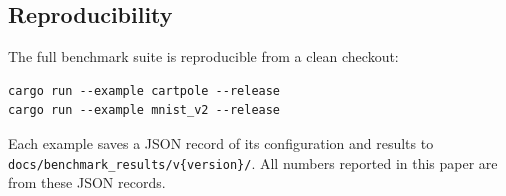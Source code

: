 \subsection{Reproducibility}

The full benchmark suite is reproducible from a clean checkout:
\begin{verbatim}
cargo run --example cartpole --release
cargo run --example mnist_v2 --release
\end{verbatim}
Each example saves a JSON record of its configuration and results to \texttt{docs/\allowbreak benchmark\_results/\allowbreak v\{version\}/}. All numbers reported in this paper are from these JSON records.
